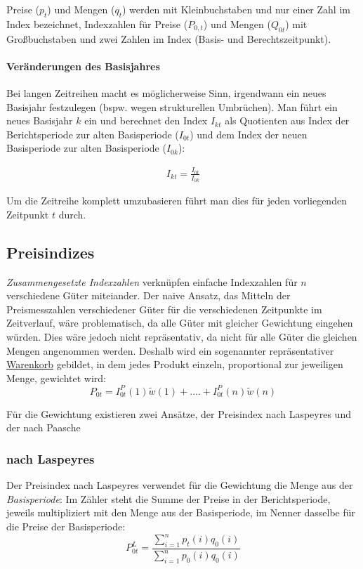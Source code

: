 \documentclass[a4paper]{article}
\newcommand\dangersign{%
 \makebox[1.8em][c]{%
 \makebox[0pt][c]{\raisebox{.15em}{\small!}}%
 \makebox[0pt][c]{\color{red}\Large$\triangle$}}}%
\begin{document}
\noindent \dangersign Preise ($p_t$) und Mengen ($q_t$) werden mit Kleinbuchstaben und nur einer Zahl im Index bezeichnet, Indexzahlen für Preise ($P_{0,t}$) und Mengen ($Q_{0t}$) mit Großbuchstaben und zwei Zahlen im Index (Basis- und Berechtszeitpunkt).

\paragraph{Veränderungen des Basisjahres} Bei langen Zeitreihen macht es möglicherweise Sinn, irgendwann ein neues Basisjahr festzulegen (bspw. wegen strukturellen Umbrüchen). Man führt ein neues Basisjahr $k$ ein und berechnet den Index $I_{kt}$ als Quotienten aus Index der Berichtsperiode zur alten Basisperiode ($I_{0t}$) und dem Index der neuen Basisperiode zur alten Basisperiode ($I_{0k}$):

\begin{align*}
    I_{kt}=\frac{I_{0t}}{I_{0k}}
\end{align*}

\noindent Um die Zeitreihe komplett umzubasieren führt man dies für jeden vorliegenden Zeitpunkt $t$ durch.

\clearpage

\subsection{Preisindizes}\label{sec:preis}
\textit{Zusammengesetzte Indexzahlen} verknüpfen  einfache Indexzahlen für $n$ verschiedene Güter miteiander. Der naive Ansatz, das Mitteln der Preismesszahlen verschiedener Güter für die verschiedenen Zeitpunkte im Zeitverlauf, wäre problematisch, da alle Güter mit gleicher Gewichtung eingehen würden. Dies wäre jedoch nicht repräsentativ, da nicht für alle Güter die gleichen Mengen angenommen werden. 
Deshalb wird ein sogenannter repräsentativer \href{https://www.destatis.de/DE/Themen/Wirtschaft/Preise/Verbraucherpreisindex/Methoden/Downloads/waegungsschema-2015.pdf;jsessionid=8FB8106A47EAAE26AF0095FEDD152C69.internet8721?__blob=publicationFile}{Warenkorb} gebildet, in dem jedes Produkt einzeln, proportional zur jeweiligen Menge, gewichtet wird:
$$P_{0t}=I_{0t}^P(1) \tilde w(1)+....+I_{0t}^P(n)\tilde w (n)$$

\noindent Für die Gewichtung existieren zwei Ansätze, der Preisindex nach Laspeyres und der nach Paasche

\subsubsection{nach Laspeyres}\label{sec:p-laspeyres}
Der Preisindex nach Laspeyres verwendet für die Gewichtung die Menge aus der \textit{Basisperiode}:
Im Zähler steht die Summe der Preise in der Berichtsperiode, jeweils multipliziert mit den Menge aus der Basisperiode, im Nenner dasselbe für die Preise der Basisperiode:
$$P_{0t}^L =\frac{\sum_{i=1}^n p_t(i)q_0(i)}{\sum_{i=1}^n p_0(i)q_0(i)}$$
\end{document}
